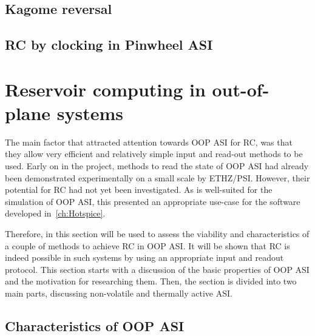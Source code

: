 \subsection{Kagome reversal} %
\subsection{RC by clocking in Pinwheel ASI}

\section{Reservoir computing in out-of-plane systems}
The main factor that attracted attention towards OOP ASI for RC, was that they allow very efficient and relatively simple input and read-out methods to be used.
Early on in the \spinengine project, methods to read the state of OOP ASI had already been demonstrated experimentally on a small scale by ETHZ/PSI.
However, their potential for RC had not yet been investigated.
As \hotspice is well-suited for the simulation of OOP ASI, this presented an appropriate use-case for the software developed in~\cref{ch:Hotspice}. %
\par
Therefore, in this section \hotspice will be used to assess the viability and characteristics of a couple of methods to achieve RC in OOP ASI.
It will be shown that RC is indeed possible in such systems by using an appropriate input and readout protocol.
This section starts with a discussion of the basic properties of OOP ASI and the motivation for researching them.
Then, the section is divided into two main parts, discussing non-volatile and thermally active ASI. %
\subsection{Characteristics of OOP ASI}
